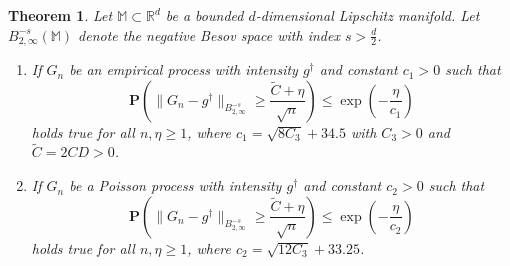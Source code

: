 \documentclass[10pt]{iopart}
\newtheorem{theorem}{Theorem}[section]
\begin{document}
\begin{theorem}\label{Theorem-3.4} 
Let $\mathbb{M}\subset \mathbb{R}^{d}$ be a bounded $d$-dimensional Lipschitz manifold. Let $B_{2,\infty}^{-s}(\mathbb{M})$ 
denote the negative Besov space with index $s>\frac{d}{2}$. 
\begin{enumerate}
 \item  If $G_{n}$ be an empirical process with 
intensity $g^{\dagger}$ and constant $c_{1}>0$ such that
\begin{equation}\label{17}
\mathbf{P}\left(\|G_{n}-g^{\dagger}\|_{B_{2, \infty}^{-s}}\geq 
\frac{\tilde{C}+\eta}{\sqrt{n}}\right)\leq \exp\left(-\frac{\eta}{c_{1}}\right)
\end{equation}
holds true for all $n, \eta\geq 1$, where $c_{1}=\sqrt{8C_{3}}+34.5$ with $C_{3}>0$ and $\tilde{C}=2CD>0$.

\item If $G_{n}$ be a Poisson process with intensity $g^{\dagger}$ and constant $c_{2}>0$ such that
\begin{equation}\label{18}
\mathbf{P}\left(\|G_{n}-g^{\dagger}\|_{B_{2, \infty}^{-s}}\geq 
\frac{\tilde{C}+\eta}{\sqrt{n}}\right)\leq \exp\left(-\frac{\eta}{c_{2}}\right)
\end{equation}
holds true for all $n, \eta\geq 1$, where $c_{2}=\sqrt{12C_{3}}+33.25$.
\end{enumerate}
\end{theorem}
\end{document}
